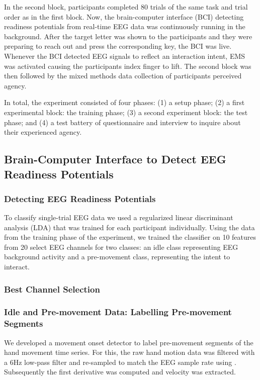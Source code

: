 In the second block, participants completed 80 trials of the same task and trial order as in the first block. Now, the brain-computer interface (BCI) detecting readiness potentials from real-time EEG data was continuously running in the background. After the target letter was shown to the participants and they were preparing to reach out and press the corresponding key, the BCI was live. Whenever the BCI detected EEG signals to reflect an interaction intent, EMS was activated causing the participants index finger to lift. The second block was then followed by the mixed methods data collection of participants perceived agency. 

In total, the experiment consisted of four phases: (1) a setup phase; (2) a first experimental block: the training phase; (3) a second experiment block: the test phase; and (4) a test battery of questionnaire and interview to inquire about their experienced agency.

\subsection{Brain-Computer Interface to Detect EEG Readiness Potentials }

\subsubsection{Detecting EEG Readiness Potentials}

To classify single-trial EEG data we used a regularized linear discriminant analysis (LDA) that was trained for each participant individually. Using the data from the training phase of the experiment, we trained the classifier on 10 features from 20 select EEG channels for two classes: an idle class representing EEG background activity and a pre-movement class, representing the intent to interact.


\subsubsection{Best Channel Selection}

\subsubsection{Idle and Pre-movement Data: Labelling Pre-movement Segments}
We developed a movement onset detector to label pre-movement segments of the hand movement time series. For this, the raw hand motion data was filtered with a 6Hz low-pass filter and re-sampled to match the EEG sample rate using . Subsequently the first derivative was computed and velocity was extracted.

